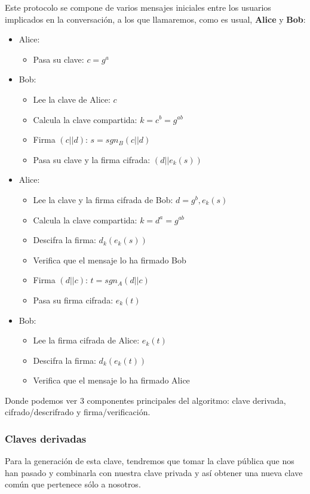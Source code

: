 \documentclass[a4paper, 11pt]{article}
\begin{document}
		Este protocolo se compone de varios mensajes iniciales entre los usuarios implicados en la conversación, a los que
		llamaremos, como es usual, \textbf{Alice} y \textbf{Bob}:
		
		\begin{itemize}
			\item Alice:
			\begin{itemize}
				\item Pasa su clave: $c = g^a$
			\end{itemize}
			\item Bob:
			\begin{itemize}
				\item Lee la clave de Alice: $c$
				\item Calcula la clave compartida: $k = c^b = g^{ab}$
				\item Firma $(c || d)$: $s = sgn_B (c || d)$
				\item Pasa su clave y la firma cifrada: $(d || e_k(s))$
			\end{itemize}
			\item Alice:
			\begin{itemize}
				\item Lee la clave y la firma cifrada de Bob: $d = g^b, e_k(s)$
				\item Calcula la clave compartida: $k = d^a = g^{ab}$
				\item Descifra la firma: $d_k(e_k(s))$
				\item Verifica que el mensaje lo ha firmado Bob
				\item Firma $(d || c)$: $t = sgn_A (d || c)$
				\item Pasa su firma cifrada: $e_k(t)$
			\end{itemize}
			\item Bob:
			\begin{itemize}
				\item Lee la firma cifrada de Alice: $e_k(t)$
				\item Descifra la firma: $d_k(e_k(t))$
				\item Verifica que el mensaje lo ha firmado Alice
			\end{itemize}
		\end{itemize}
		
		Donde podemos ver 3 componentes principales del algoritmo: clave derivada, cifrado/descrifrado y firma/verificación.
		
		\subsubsection{Claves derivadas}
			Para la generación de esta clave, tendremos que tomar la clave pública que nos han pasado y combinarla con nuestra
			clave privada y así obtener una nueva clave común que pertenece sólo a nosotros.
			
\end{document}
